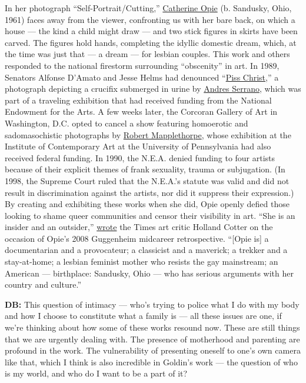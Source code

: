 In her photograph ``Self-Portrait/Cutting,''
\href{https://www.nytimes.com/search?query=Opie\%252C+Catherine}{Catherine
Opie} (b. Sandusky, Ohio, 1961) faces away from the viewer, confronting
us with her bare back, on which a house --- the kind a child might draw
--- and two stick figures in skirts have been carved. The figures hold
hands, completing the idyllic domestic dream, which, at the time was
just that --- a dream --- for lesbian couples. This work and others
responded to the national firestorm surrounding ``obscenity'' in art. In
1989, Senators Alfonse D'Amato and Jesse Helms had denounced
``\href{https://www.christies.com/lotfinder/Lot/andres-serrano-b-1950-piss-christ-5070403-details.aspx}{Piss
Christ},'' a photograph depicting a crucifix submerged in urine by
\href{https://www.nytimes.com/2019/04/10/arts/andres-serrano-lets-objects-do-the-talking.html}{Andres
Serrano}, which was part of a traveling exhibition that had received
funding from the National Endowment for the Arts. A few weeks later, the
Corcoran Gallery of Art in Washington, D.C. opted to cancel a show
featuring homoerotic and sadomasochistic photographs by
\href{https://www.nytimes.com/2018/11/23/t-magazine/robert-mappelthorpe-michael-cunningham-elif-batuman-hilton-als.html}{Robert
Mapplethorpe}, whose exhibition at the Institute of Contemporary Art at
the University of Pennsylvania had also received federal funding. In
1990, the N.E.A. denied funding to four artists because of their
explicit themes of frank sexuality, trauma or subjugation. (In 1998, the
Supreme Court ruled that the N.E.A.'s statute was valid and did not
result in discrimination against the artists, nor did it suppress their
expression.) By creating and exhibiting these works when she did, Opie
openly defied those looking to shame queer communities and censor their
visibility in art. ``She is an insider and an outsider,''
\href{https://www.nytimes.com/2008/09/26/arts/design/26opie.html}{wrote}
the Times art critic Holland Cotter on the occasion of Opie's 2008
Guggenheim midcareer retrospective. ``{[}Opie is{]} a documentarian and
a provocateur; a classicist and a maverick; a trekker and a
stay-at-home; a lesbian feminist mother who resists the gay mainstream;
an American --- birthplace: Sandusky, Ohio --- who has serious arguments
with her country and culture.''

\textbf{DB:} This question of intimacy --- who's trying to police what I
do with my body and how I choose to constitute what a family is --- all
these issues are one, if we're thinking about how some of these works
resound now. These are still things that we are urgently dealing with.
The presence of motherhood and parenting are profound in the work. The
vulnerability of presenting oneself to one's own camera like that, which
I think is also incredible in Goldin's work --- the question of who is
my world, and who do I want to be a part of it?

